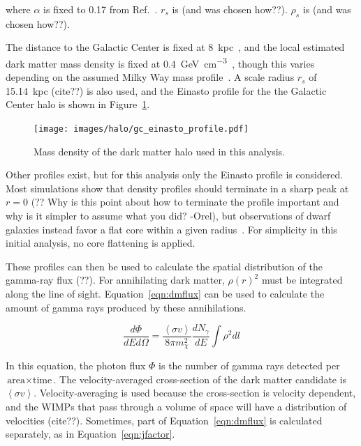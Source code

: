     where $\alpha$ is fixed to 0.17 from Ref.~\cite{PieriGalaxySims}.
    $r_s$ is {\color{red}(and was chosen how??)}.
    $\rho_s$ is {\color{red}(and was chosen how??)}.

    The distance to the Galactic Center is fixed at \SI{8}{kpc}~\cite{gc_distance_1,gc_distance_2,gc_distance_3}, and the local estimated dark matter mass density is fixed at \SI{0.4}{\GeV\per\cm^3}~\cite{local_dm_density}, though this varies depending on the assumed Milky Way mass profile~\cite{direct_dm_astrophysical_uncertainties}.
    A scale radius $r_s$ of \SI{15.14}{kpc} {\color{red}(cite??)} is also used, and the Einasto profile for the the Galactic Center halo is shown in Figure~\ref{fig:gchalo_density}.
  
    \begin{figure}[ht]
      \centering
      \texttt{[image: images/halo/gc\_einasto\_profile.pdf]}
      \caption[Galactic Center Einasto Halo Density]{
        Mass density of the dark matter halo used in this analysis.
        \CaptionBlankLine
        }
      \label{fig:gchalo_density}
    \end{figure}
    
    Other profiles exist, but for this analysis only the Einasto profile is considered.
    Most simulations show that density profiles should terminate in a sharp peak at $r=0$ {\color{red}(?? Why is this point about how to terminate the profile important and why is it simpler to assume what you did? -Orel)}, but observations of dwarf galaxies instead favor a flat core within a given radius~\cite{CoreVsCusp}.
    For simplicity in this initial analysis, no core flattening is applied.
    
    These profiles can then be used to calculate the spatial distribution of the gamma-ray {\color{red}flux (??)}.
    For annihilating dark matter, $\rho\left(r\right)^2$ must be integrated along the line of sight.
    Equation~\ref{eqn:dmflux} can be used to calculate the amount of gamma rays produced by these annihilations.
    
    \begin{equation}\label{eqn:dmflux}
      \frac{ d\Phi }{ dE d \Omega } = \frac{ \left \langle \sigma v \right \rangle }{8 \pi m_\chi^2} \frac{dN_{\gamma}}{dE} \int \rho^2 dl
    \end{equation}
    
    In this equation, the photon flux $\Phi$ is the number of gamma rays detected per $\textrm{area}\times\textrm{time}$.
    The velocity-averaged cross-section of the dark matter candidate is $\left \langle \sigma v \right \rangle$.
    Velocity-averaging is used because the cross-section is velocity dependent, and the WIMPs that pass through a volume of space will have a distribution of velocities {\color{red}(cite??)}.
    Sometimes, part of Equation~\ref{eqn:dmflux} is calculated separately, as in Equation~\ref{eqn:jfactor}.

